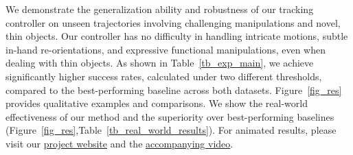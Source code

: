 
        
 







We demonstrate the generalization ability and robustness of our tracking controller on unseen trajectories involving challenging manipulations and novel, thin objects. Our controller has no difficulty in handling intricate motions, subtle in-hand re-orientations, and expressive functional manipulations, even when dealing with thin objects. 
As shown in Table~\ref{tb_exp_main}, we achieve significantly higher success rates, calculated under two different thresholds, compared to the best-performing baseline across both datasets. Figure~\ref{fig_res} provides qualitative examples and comparisons. We show the real-world effectiveness of our method and the superiority over best-performing baselines (Figure~\ref{fig_res},Table~\ref{tb_real_world_results}). For animated results, please visit our \href{https://meowuu7.github.io/DexTrack/}{project website} and the \href{https://youtu.be/zru1Z-DaiWE}{accompanying video}.



